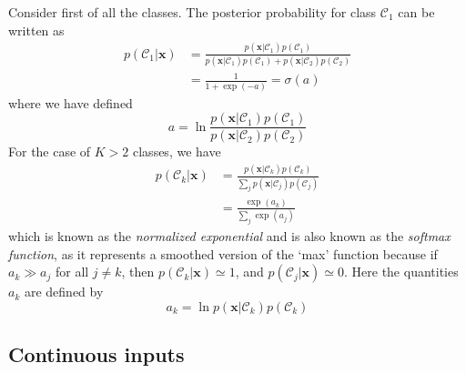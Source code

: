 \documentclass[5p,sort&compress]{elsarticle}
\begin{document}
Consider first of all the classes. The posterior probability for class $\mathcal{C}_1$ can be written as
\begin{equation}
\begin{aligned} p\left(\mathcal{C}_{1} | \mathbf{x}\right) &=\frac{p\left(\mathbf{x} | \mathcal{C}_{1}\right) p\left(\mathcal{C}_{1}\right)}{p\left(\mathbf{x} | \mathcal{C}_{1}\right) p\left(\mathcal{C}_{1}\right)+p\left(\mathbf{x} | \mathcal{C}_{2}\right) p\left(\mathcal{C}_{2}\right)} \\ &=\frac{1}{1+\exp (-a)}=\sigma(a) \end{aligned}
\end{equation}
where we have defined 
\begin{equation}
a=\ln \frac{p\left(\mathbf{x} | \mathcal{C}_{1}\right) p\left(\mathcal{C}_{1}\right)}{p\left(\mathbf{x} | \mathcal{C}_{2}\right) p\left(\mathcal{C}_{2}\right)}
\end{equation}
For the case of $K > 2$ classes, we have
\begin{equation}
\begin{aligned} p\left(\mathcal{C}_{k} | \mathbf{x}\right) &=\frac{p\left(\mathbf{x} | \mathcal{C}_{k}\right) p\left(\mathcal{C}_{k}\right)}{\sum_{j} p\left(\mathbf{x} | \mathcal{C}_{j}\right) p\left(\mathcal{C}_{j}\right)} \\ &=\frac{\exp \left(a_{k}\right)}{\sum_{j} \exp \left(a_{j}\right)} \end{aligned}
\end{equation}
which is known as the \textit{normalized exponential} and is also known as the \textit{softmax function}, as it represents a smoothed version of the `max' function because if $a_k \gg a_j$ for all $j \neq k$, then $p(\mathcal{C}_k|\mathbf{x}) \simeq 1$, and $p(\mathcal{C}_j|\mathbf{x}) \simeq 0$. Here the quantities $a_k$ are defined by
\begin{equation}
a_{k}=\ln p\left(\mathbf{x} | \mathcal{C}_{k}\right) p\left(\mathcal{C}_{k}\right)
\end{equation}


\subsection{Continuous inputs}
\end{document}

